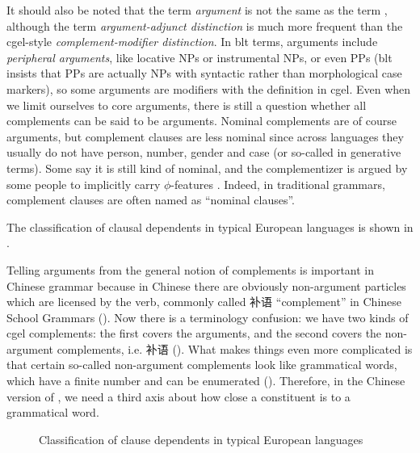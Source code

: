 \documentclass[../main.tex]{subfiles}
\begin{document}
It should also be noted that the term \emph{argument} is not the same as the term , 
although the term \emph{argument-adjunct distinction} 
is much more frequent than the \ac{cgel}-style \emph{complement-modifier distinction}. 
In \ac{blt} terms, arguments include \emph{peripheral arguments},
like locative NPs or instrumental NPs, or even PPs 
(\ac{blt} insists that PPs are actually NPs with syntactic rather than morphological case markers), 
so some arguments are modifiers with the definition in \ac{cgel}. 
Even when we limit ourselves to core arguments, 
there is still a question whether all complements can be said to be arguments. 
Nominal complements are of course arguments, 
but complement clauses are less nominal 
since across languages they usually do not have person, number, gender and case 
(or so-called  in generative terms). 
Some say it is still kind of nominal, 
and the complementizer is argued by some people to implicitly carry $\phi$-features \citep{complement-clause}.
Indeed, in traditional grammars, complement clauses are often named as ``nominal clauses''.

The classification of clausal dependents in typical European languages is shown in .

Telling arguments from the general notion of complements is important in Chinese grammar 
because in Chinese there are obviously non-argument particles which are licensed by the verb, 
commonly called 补语 ``complement'' in Chinese School Grammars ().
Now there is a terminology confusion: we have two kinds of \ac{cgel} complements:
the first covers the arguments, and the second covers the non-argument complements, i.e. 补语 ().
What makes things even more complicated is that certain so-called non-argument complements 
look like grammatical words, which have a finite number and can be enumerated ().
Therefore, in the Chinese version of ,
we need a third axis about how close a constituent is to a grammatical word.

\begin{figure}
    \centering
    
    \caption{Classification of clause dependents in typical European languages}
    \label{fig:clause-dependent-classification}
\end{figure}
\end{document}
